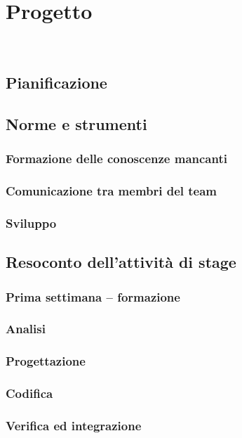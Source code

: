 
\chapter{Progetto}
\label{cap:progetto}

\\

\section{Pianificazione}

\section{Norme e strumenti}

\subsection{Formazione delle conoscenze mancanti}

\subsection{Comunicazione tra membri del team}

\subsection{Sviluppo}

\section{Resoconto dell'attività di stage}

\subsection{Prima settimana -- formazione}

\subsection{Analisi}

\subsection{Progettazione}

\subsection{Codifica}

\subsection{Verifica ed integrazione}
